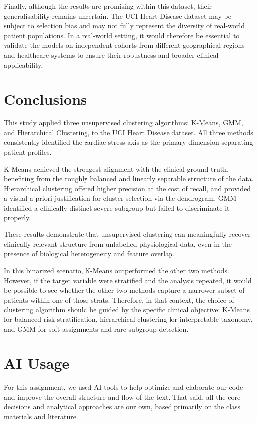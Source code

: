 \documentclass[twocolumn, fontsize=10pt]{article}
\begin{document}
Finally, although the results are promising within this dataset, their generalisability remains uncertain. The UCI Heart Disease dataset may be subject to selection bias and may not fully represent the diversity of real-world patient populations. In a real-world setting, it would therefore be essential to validate the models on independent cohorts from different geographical regions and healthcare systems to ensure their robustness and broader clinical applicability.

\section{Conclusions}
\label{sec:conclusions}

This study applied three unsupervised clustering algorithms: K-Means, GMM, and Hierarchical Clustering, to the UCI Heart Disease dataset. All three methods consistently identified the cardiac stress axis as the primary dimension separating patient profiles.

K-Means achieved the strongest alignment with the clinical ground truth, benefiting from the roughly balanced and linearly separable structure of the data. Hierarchical clustering offered higher precision at the cost of recall, and provided a visual a priori justification for cluster selection via the dendrogram. GMM identified a clinically distinct severe subgroup but failed to discriminate it properly.

These results demonstrate that unsupervised clustering can meaningfully recover clinically relevant structure from unlabelled physiological data, even in the presence of biological heterogeneity and feature overlap. 

In this binarized scenario, K-Means outperformed the other two methods.
However, if the target variable were stratified and the analysis repeated, it would be possible to see whether the other two methods capture a narrower subset of patients within one of those strats. Therefore, in that context, the choice of clustering algorithm should be guided by the specific clinical objective: K-Means for balanced risk stratification, hierarchical clustering for interpretable taxonomy, and GMM for soft assignments and rare-subgroup detection.




\section*{AI Usage}
For this assignment, we used AI tools to help optimize and elaborate our code and improve the overall structure and flow of the text. That said, all the core decisions and analytical approaches are our own, based primarily on the class materials and literature.
\end{document}
